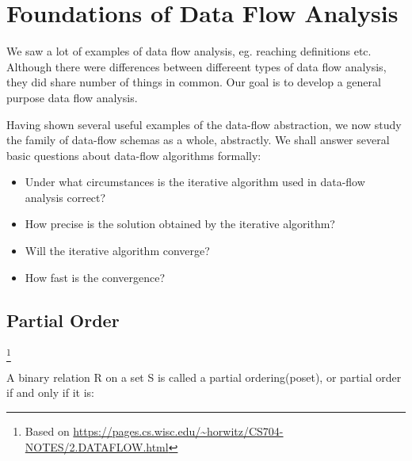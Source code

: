 \section{Foundations of Data Flow Analysis}



We saw a lot of examples of data flow analysis, eg. reaching definitions etc. Although 
there were differences between differeent types of data flow analysis, they did share number of 
things in common. Our goal is to develop a general purpose data flow analysis.




































Having shown several useful examples of the data-flow abstraction, 
we now study the family of data-flow schemas as a whole, abstractly. 
We shall answer several basic questions about data-flow algorithms formally:

\begin{itemize}

\item Under what circumstances is the iterative algorithm used in data-flow analysis correct?
\item How precise is the solution obtained by the iterative algorithm?
\item Will the iterative algorithm converge?
\item How fast is the convergence?
\end{itemize}


\subsection{Partial Order}\footnote{Based on \url{https://pages.cs.wisc.edu/~horwitz/CS704-NOTES/2.DATAFLOW.html}}

A binary relation R on a set S is called a partial ordering(poset), or partial order if and only if it is:

